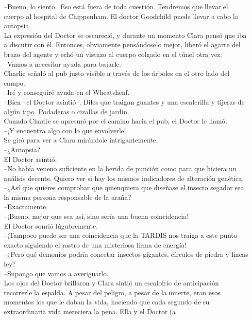 --Bueno, lo siento.~Eso está fuera de toda cuestión. Tendremos que
llevar el cuerpo al hospital de Chippenham. El doctor Goodchild puede
llevar a cabo la autopsia.\\
La expresión del Doctor se oscureció, y durante un momento Clara pensó
que iba a discutir con él. Entonces, obviamente pensándoselo mejor,
liberó el agarre del brazo del agente y echó un vistazo al cuerpo
colgado en el túnel otra vez.\\
--Vamos a necesitar ayuda para bajarle.\\
Charlie señaló al pub justo visible a través de los árboles en el otro
lado del campo.\\
--Iré y conseguiré ayuda en el Wheatsheaf.\\
--Bien --el Doctor asintió--. Diles que traigan guantes y una
escalerilla y tijeras de algún tipo. Podaderas o cizallas de jardín.\\
Cuando Charlie se apresuró por el camino hacia el pub, el Doctor le
llamó.\\
--¡Y encuentra algo con lo que envolverle!\\
Se giró para ver a Clara mirándole intrigantemente.\\
--¿Autopsia?\\
El Doctor asintió.\\
--No había veneno suficiente en la herida de punción como para que
hiciera un análisis decente. Quiero ver si hay los mismos indicadores de
alteración genética.\\
--¿Así que quieres comprobar que quienquiera que diseñase el insecto
segador sea la misma persona responsable de la araña?\\
--Exactamente.\\
--¡Bueno, mejor que sea así, sino sería una buena coincidencia!\\
El Doctor sonrió lúgubremente.\\
--¡Tampoco puede ser una coincidencia que la TARDIS nos traiga a este
punto exacto siguiendo el rastro de una misteriosa firma de energía!\\
--¿Pero qué demonios podría conectar insectos gigantes, círculos de
piedra y líneas ley?\\
--Supongo que vamos a averiguarlo.\\
Los ojos del Doctor brillaron y Clara sintió un escalofrío de
anticipación recorrerle la espalda. A pesar del peligro, a pesar de la
muerte, eran esos momentos los que le daban la vida, haciendo que cada
segundo de su extraordinaria vida mereciera la pena. Ella y el Doctor (a
